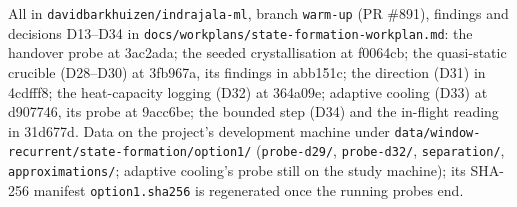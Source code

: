 \documentclass[11pt]{article}
\begin{document}
All in \texttt{davidbarkhuizen/indrajala-ml}, branch \texttt{warm-up} (PR \#891), findings and
decisions D13--D34 in \texttt{docs/workplans/state-formation-workplan.md}: the handover probe at 3ac2ada; the
seeded crystallisation at f0064cb; the quasi-static crucible (D28--D30) at 3fb967a, its findings in
abb151c; the direction (D31) in 4cdfff8; the heat-capacity logging (D32) at 364a09e; adaptive
cooling (D33) at d907746, its probe at 9acc6be; the bounded step (D34) and the in-flight reading in
31d677d. Data on the project's development machine under
\texttt{data/window-recurrent/state-formation/option1/} (\texttt{probe-d29/}, \texttt{probe-d32/},
\texttt{separation/}, \texttt{approximations/}; adaptive cooling's probe still on the study machine);
its SHA-256 manifest \texttt{option1.sha256} is regenerated once the running probes end.



\end{document}
